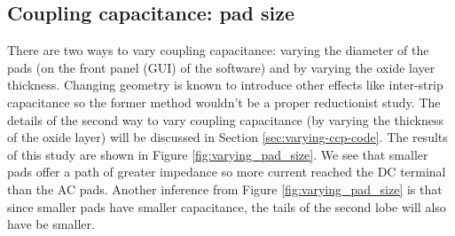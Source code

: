 \documentclass[11pt]{article}
\begin{document}
\subsection{Coupling capacitance: pad size}
There are two ways to vary coupling capacitance: varying the diameter of the pads (on the front panel (GUI) of the software) and by varying the oxide layer thickness. Changing geometry is known to introduce other effects like inter-strip capacitance so the former method wouldn't be a proper reductionist study. The details of the second way to vary coupling capacitance (by varying the thickness of the oxide layer) will be discussed in Section \ref{sec:varying-ccp-code}. The results of this study are shown in Figure \ref{fig:varying_pad_size}. We see that smaller pads offer a path of greater impedance so more current reached the DC terminal than the AC pads. Another inference from Figure \ref{fig:varying_pad_size} is that since smaller pads have smaller capacitance, the tails of the second lobe will also have be smaller.
\end{document}
